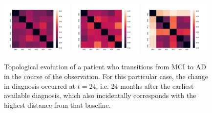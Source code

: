 \documentclass{article}
\begin{document}
\begin{figure}
  \centering \includegraphics[width=0.32\textwidth]{figures/temporal_evolution/ADNI029S0878_h_0.png}
  \hfill \includegraphics[width=0.32\textwidth]{figures/temporal_evolution/ADNI029S0878_h_1.png}
  \hfill \includegraphics[width=0.32\textwidth]{figures/temporal_evolution/ADNI029S0878_h_2.png}
    \caption{Topological evolution of a patient who transitions from MCI to AD in the course of the
      observation. For this particular case, the change in diagnosis occurred at $t=24$, i.e. 24
      months after the earliest available diagnosis, which also incidentally corresponds with the
highest distance from that baseline.}
    \label{fig:patient_evolution_mci_ad}
\end{figure}
\end{document}
